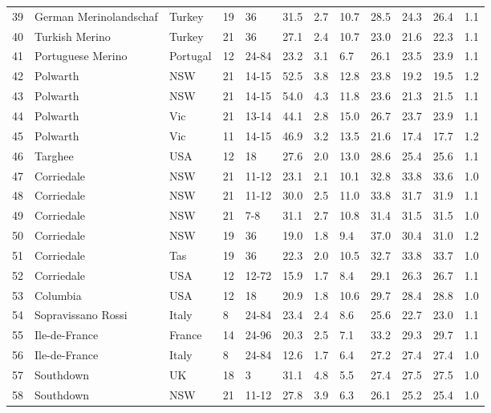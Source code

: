 \begin{center}
\begin{landscape}
\begin{longtable}{|p{0.4in}|p{0.9in}|p{0.7in}|p{0.4in}|p{0.45in}|p{0.45in}|p{0.45in}|p{0.45in}|p{0.45in}|p{0.45in}|p{0.45in}|p{0.45in}|}
 39 &  German Merinolandschaf &  Turkey & 19 &  36 & 31.5 & 2.7 & 10.7 & 28.5 & 24.3 & 26.4 & 1.1 \\ 
 40 &  Turkish Merino &  Turkey & 21 &  36 & 27.1 & 2.4 & 10.7 & 23.0 & 21.6 & 22.3 & 1.1 \\ 
 41 &  Portuguese Merino &  Portugal & 12 &  24-84 & 23.2 & 3.1 & 6.7 & 26.1 & 23.5 & 23.9 & 1.1 \\ 
 42 &  Polwarth &  NSW & 21 &  14-15 & 52.5 & 3.8 & 12.8 & 23.8 & 19.2 & 19.5 & 1.2 \\ 
 43 &  Polwarth &  NSW & 21 &  14-15 & 54.0 & 4.3 & 11.8 & 23.6 & 21.3 & 21.5 & 1.1 \\ 
 44 &  Polwarth &  Vic & 21 &  13-14 & 44.1 & 2.8 & 15.0 & 26.7 & 23.7 & 23.9 & 1.1 \\ 
 45 &  Polwarth &  Vic & 11 &  14-15 & 46.9 & 3.2 & 13.5 & 21.6 & 17.4 & 17.7 & 1.2 \\ 
 46 &  Targhee &  USA & 12 &  18 & 27.6 & 2.0 & 13.0 & 28.6 & 25.4 & 25.6 & 1.1 \\ 
 47 &  Corriedale &  NSW & 21 &  11-12 & 23.1 & 2.1 & 10.1 & 32.8 & 33.8 & 33.6 & 1.0 \\ 
 48 &  Corriedale &  NSW & 21 &  11-12 & 30.0 & 2.5 & 11.0 & 33.8 & 31.7 & 31.9 & 1.1 \\ 
 49 &  Corriedale &  NSW & 21 &  7-8 & 31.1 & 2.7 & 10.8 & 31.4 & 31.5 & 31.5 & 1.0 \\ 
 50 &  Corriedale &  NSW & 19 &  36 & 19.0 & 1.8 & 9.4 & 37.0 & 30.4 & 31.0 & 1.2 \\ 
 51 &  Corriedale &  Tas & 19 &  36 & 22.3 & 2.0 & 10.5 & 32.7 & 33.8 & 33.7 & 1.0 \\ 
 52 &  Corriedale &  USA & 12 &  12-72 & 15.9 & 1.7 & 8.4 & 29.1 & 26.3 & 26.7 & 1.1 \\ 
 53 &  Columbia &  USA & 12 &  18 & 20.9 & 1.8 & 10.6 & 29.7 & 28.4 & 28.8 & 1.0 \\ 
 54 &  Sopravissano Rossi &  Italy &  8 &  24-84 & 23.4 & 2.4 & 8.6 & 25.6 & 22.7 & 23.0 & 1.1 \\ 
 55 &  Ile-de-France &  France & 14 &  24-96 & 20.3 & 2.5 & 7.1 & 33.2 & 29.3 & 29.7 & 1.1 \\ 
 56 &  Ile-de-France &  Italy &  8 &  24-84 & 12.6 & 1.7 & 6.4 & 27.2 & 27.4 & 27.4 & 1.0 \\ 
 57 &  Southdown &  UK & 18 &  3 & 31.1 & 4.8 & 5.5 & 27.4 & 27.5 & 27.5 & 1.0 \\ 
 58 &  Southdown &  NSW & 21 &  11-12 & 27.8 & 3.9 & 6.3 & 26.1 & 25.2 & 25.4 & 1.0 \\ 

\end{longtable}
\end{landscape}
\end{center}
